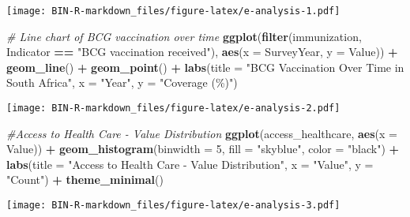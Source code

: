 \documentclass[
]{article}
\newenvironment{Shaded}{\begin{snugshade}}{\end{snugshade}}
\newcommand{\AttributeTok}[1]{\textcolor[rgb]{0.13,0.29,0.53}{#1}}
\newcommand{\CommentTok}[1]{\textcolor[rgb]{0.56,0.35,0.01}{\textit{#1}}}
\newcommand{\DecValTok}[1]{\textcolor[rgb]{0.00,0.00,0.81}{#1}}
\newcommand{\FunctionTok}[1]{\textcolor[rgb]{0.13,0.29,0.53}{\textbf{#1}}}
\newcommand{\NormalTok}[1]{#1}
\newcommand{\SpecialCharTok}[1]{\textcolor[rgb]{0.81,0.36,0.00}{\textbf{#1}}}
\newcommand{\StringTok}[1]{\textcolor[rgb]{0.31,0.60,0.02}{#1}}
\begin{document}
\texttt{[image: BIN-R-markdown\_files/figure-latex/e-analysis-1.pdf]}

\begin{Shaded}
\begin{Highlighting}[]
\CommentTok{\# Line chart of BCG vaccination over time}
\FunctionTok{ggplot}\NormalTok{(}\FunctionTok{filter}\NormalTok{(immunization, Indicator }\SpecialCharTok{==} \StringTok{"BCG vaccination received"}\NormalTok{),}
       \FunctionTok{aes}\NormalTok{(}\AttributeTok{x =}\NormalTok{ SurveyYear, }\AttributeTok{y =}\NormalTok{ Value)) }\SpecialCharTok{+}
  \FunctionTok{geom\_line}\NormalTok{() }\SpecialCharTok{+}
  \FunctionTok{geom\_point}\NormalTok{() }\SpecialCharTok{+}
  \FunctionTok{labs}\NormalTok{(}\AttributeTok{title =} \StringTok{"BCG Vaccination Over Time in South Africa"}\NormalTok{,}
       \AttributeTok{x =} \StringTok{"Year"}\NormalTok{, }\AttributeTok{y =} \StringTok{"Coverage (\%)"}\NormalTok{)}
\end{Highlighting}
\end{Shaded}

\texttt{[image: BIN-R-markdown\_files/figure-latex/e-analysis-2.pdf]}

\begin{Shaded}
\begin{Highlighting}[]
\CommentTok{\#Access to Health Care {-} Value Distribution}
\FunctionTok{ggplot}\NormalTok{(access\_healthcare, }\FunctionTok{aes}\NormalTok{(}\AttributeTok{x =}\NormalTok{ Value)) }\SpecialCharTok{+}
  \FunctionTok{geom\_histogram}\NormalTok{(}\AttributeTok{binwidth =} \DecValTok{5}\NormalTok{, }\AttributeTok{fill =} \StringTok{"skyblue"}\NormalTok{, }\AttributeTok{color =} \StringTok{"black"}\NormalTok{) }\SpecialCharTok{+}
  \FunctionTok{labs}\NormalTok{(}\AttributeTok{title =} \StringTok{"Access to Health Care {-} Value Distribution"}\NormalTok{, }\AttributeTok{x =} \StringTok{"Value"}\NormalTok{, }\AttributeTok{y =} \StringTok{"Count"}\NormalTok{) }\SpecialCharTok{+}
  \FunctionTok{theme\_minimal}\NormalTok{()}
\end{Highlighting}
\end{Shaded}

\texttt{[image: BIN-R-markdown\_files/figure-latex/e-analysis-3.pdf]}
\end{document}
